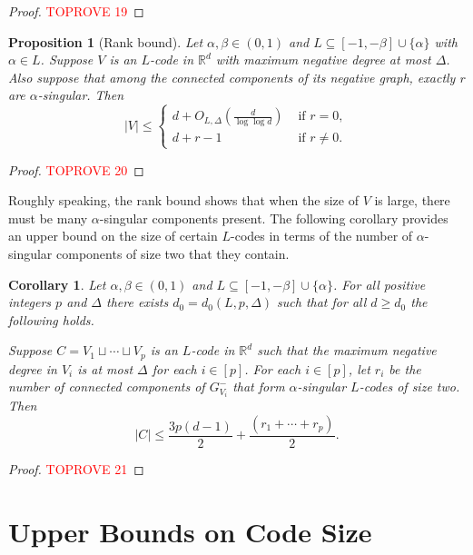 \documentclass[reqno, 11pt]{amsart}
\newtheorem{proposition}[theorem]{Proposition}
\newtheorem{corollary}[theorem]{Corollary}
\theoremstyle{definition}
\theoremstyle{remark}
\newcommand{\abs}[1]{\left\lvert#1\right\rvert}
\newcommand{\paren}[1]{\left( #1 \right)}
\newcommand{\RR}{\mathbb{R}}
\begin{document}
\begin{proof}\textcolor{red}{TOPROVE 19}\end{proof}


\begin{proposition}[Rank bound]\label{prop:rank-bound}
Let $\alpha, \beta \in (0,1)$ and $L \subseteq [-1,-\beta] \cup \{\alpha\}$ with $\alpha \in L$.
Suppose $V$ is an $L$-code in $\RR^d$ with maximum negative degree at most $\Delta$.
Also suppose that among the connected components of its negative graph, exactly $r$ are $\alpha$-singular. 
Then
\[
\abs{V} \leq \begin{cases}
					d + O_{L,\Delta}\paren{\frac{d}{\log \log d}} & \text{ if } r = 0, \\
					d + r - 1 & \text{ if } r \neq 0.
				\end{cases}	
\]
\end{proposition}


\begin{proof}\textcolor{red}{TOPROVE 20}\end{proof}

Roughly speaking, the rank bound shows that when the size of $V$ is large, there must be many $\alpha$-singular components present. The following corollary provides an upper bound on the size of certain $L$-codes in terms of the number of $\alpha$-singular components of size two that they contain. 

   
\begin{corollary}\label{cor:rank-appl}
Let $\alpha, \beta \in (0,1)$ and $L \subseteq [-1,-\beta] \cup \{\alpha\}$. For all positive integers $p$ and $\Delta$ there exists $d_0 = d_0(L,p,\Delta)$ such that for all $d \geq d_0$ the following holds.

Suppose $C = V_1 \sqcup \cdots \sqcup V_p$ is an $L$-code in $\RR^d$ such that the maximum negative degree in $V_i$ is at most $\Delta$ for each $i \in [p]$. For each $i \in [p]$, let $r_i$ be the number of connected components of $G_{V_i}^-$ that form $\alpha$-singular $L$-codes of size two. Then
    \[
      |C| \leq \frac{3p(d-1)}{2} + \frac{(r_1 + \cdots + r_p)}{2}.
    \]
\end{corollary}

\begin{proof}\textcolor{red}{TOPROVE 21}\end{proof}

\section{Upper Bounds on Code Size}\label{sec:upper}
\end{document}
